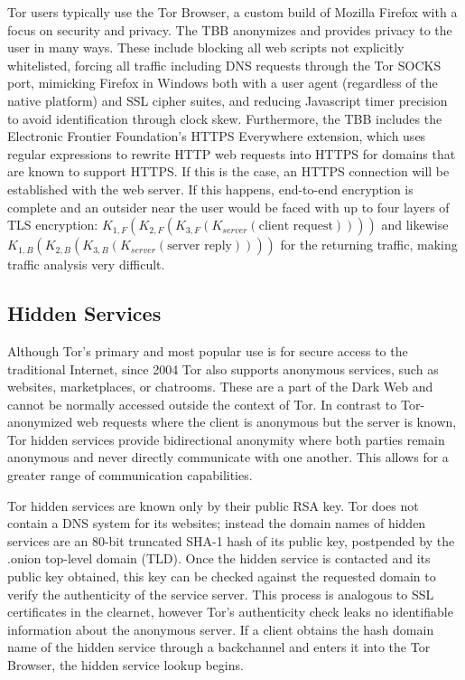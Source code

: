 
Tor users typically use the Tor Browser, a custom build of Mozilla Firefox with a focus on security and privacy. The TBB anonymizes and provides privacy to the user in many ways. These include blocking all web scripts not explicitly whitelisted, forcing all traffic including DNS requests through the Tor SOCKS port, mimicking Firefox in Windows both with a user agent (regardless of the native platform) and SSL cipher suites, and reducing Javascript timer precision to avoid identification through clock skew. Furthermore, the TBB includes the Electronic Frontier Foundation's HTTPS Everywhere extension, which uses regular expressions to rewrite HTTP web requests into HTTPS for domains that are known to support HTTPS. If this is the case, an HTTPS connection will be established with the web server. If this happens, end-to-end encryption is complete and an outsider near the user would be faced with up to four layers of TLS encryption: $K_{1,F}(K_{2,F}(K_{3,F}(K_{server}(\textrm{client\ request}))))$ and likewise $K_{1,B}(K_{2,B}(K_{3,B}(K_{server}(\textrm{server\ reply}))))$ for the returning traffic, making traffic analysis very difficult.

\subsection{Hidden Services}

Although Tor's primary and most popular use is for secure access to the traditional Internet, since 2004 Tor also supports anonymous services, such as websites, marketplaces, or chatrooms. These are a part of the Dark Web and cannot be normally accessed outside the context of Tor. In contrast to Tor-anonymized web requests where the client is anonymous but the server is known, Tor hidden services provide bidirectional anonymity where both parties remain anonymous and never directly communicate with one another. This allows for a greater range of communication capabilities.\cite{nicolussi2011human}

Tor hidden services are known only by their public RSA key. Tor does not contain a DNS system for its websites; instead the domain names of hidden services are an 80-bit truncated SHA-1 hash of its public key, postpended by the .onion top-level domain (TLD). Once the hidden service is contacted and its public key obtained, this key can be checked against the requested domain to verify the authenticity of the service server. This process is analogous to SSL certificates in the clearnet, however Tor's authenticity check leaks no identifiable information about the anonymous server. If a client obtains the hash domain name of the hidden service through a backchannel and enters it into the Tor Browser, the hidden service lookup begins.

